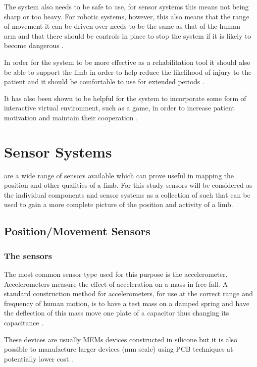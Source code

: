 \documentclass[journal]{IEEEtran}
\begin{document}
The system also needs to be safe to use, for sensor systems this means not being sharp 
or too heavy. For robotic systems, however, this also means that the range of movement it can be 
driven over needs to be the same as that of the human arm and that there should be controls in 
place to stop the system if it is likely to become dangerous \cite{ARMin}.

In order for the system to be more effective as a rehabilitation tool it should also be able to 
support the limb in order to help reduce the likelihood of injury to the patient and it should 
be comfortable to use for extended periods \cite{AdvancesPush}.

It has also been shown to be helpful for the system to incorporate some form of interactive 
virtual environment, such as a game, in order to increase patient motivation and maintain 
their cooperation \cite{AdvancesPush}.

\section{Sensor Systems}
 are a wide range of sensors available which can prove useful in 
mapping the position and other qualities of a limb. For this study sensors will be considered 
as the individual components and sensor systems as a collection of such that can be used 
to gain a more complete picture of the position and activity of a limb.

\subsection{Position/Movement Sensors}
\subsubsection{The sensors}
The most common sensor type used for this purpose is the accelerometer. Accelerometers measure 
the effect of acceleration on a mass in free-fall. A standard construction method for accelerometers, 
for use at the correct range and frequency of human motion, is to have a test mass on a damped spring 
and have the deflection of this mass move one plate of a capacitor thus changing its capacitance \cite{lowCostACs}.

These devices are usually MEMs devices constructed in silicone but it is also possible to manufacture 
larger devices (mm scale) using PCB techniques at potentially lower cost \cite{lowCostACs}.
\end{document}
